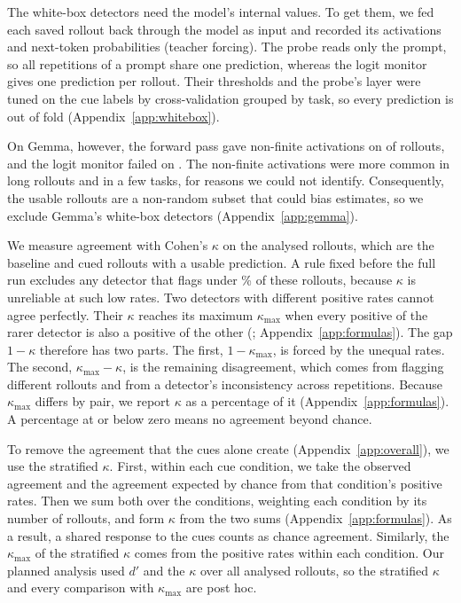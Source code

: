 The white-box detectors need the model's internal values. To get them, we fed each saved rollout
back through the model as input and recorded its activations and next-token probabilities
(teacher forcing). The probe reads only the prompt, so all repetitions of a prompt share one
prediction, whereas the logit monitor gives one prediction per rollout. Their thresholds and the
probe's layer were tuned on the cue labels by cross-validation grouped by task, so every
prediction is out of fold (Appendix~\ref{app:whitebox}).

On Gemma, however, the forward pass gave non-finite activations on  of
 rollouts, and the logit monitor failed on . The
non-finite activations were more common in long rollouts and in a few tasks, for reasons we
could not identify. Consequently, the usable rollouts are a non-random subset that could bias estimates,
so we exclude Gemma's white-box detectors (Appendix~\ref{app:gemma}).

We measure agreement with Cohen's $\kappa$ on the analysed rollouts, which are the baseline and
cued rollouts with a usable prediction. A rule fixed before the full run excludes any detector that
flags under \% of these rollouts, because $\kappa$ is unreliable at such low rates.
Two detectors with different positive rates cannot agree perfectly. Their $\kappa$ reaches its
maximum $\kappa_{\max}$ when every positive of the rarer detector is also a positive of the other
(\citealp{feinstein1990high,byrt1993bias,cohen1960coefficient}; Appendix~\ref{app:formulas}).
The gap $1 - \kappa$ therefore has two parts. The first, $1 - \kappa_{\max}$, is forced by the
unequal rates. The second, $\kappa_{\max} - \kappa$, is the remaining disagreement, which comes from
flagging different rollouts and from a detector's inconsistency across repetitions. Because
$\kappa_{\max}$ differs by pair, we report $\kappa$ as a percentage of it
(Appendix~\ref{app:formulas}). A percentage at or below zero means no agreement beyond chance.

To remove the agreement that the cues alone create (Appendix~\ref{app:overall}), we use the
stratified $\kappa$. First, within each cue condition, we take the observed agreement and the
agreement expected by chance from that condition's positive rates. Then we sum both over the
conditions, weighting each condition by its number of rollouts, and form $\kappa$ from the two
sums (Appendix~\ref{app:formulas}). As a result, a shared response to the cues counts as chance
agreement. Similarly, the $\kappa_{\max}$ of the stratified $\kappa$ comes from the positive
rates within each condition. Our planned analysis used $d'$ and the $\kappa$ over all analysed
rollouts, so the stratified $\kappa$ and every comparison with $\kappa_{\max}$ are post hoc.

